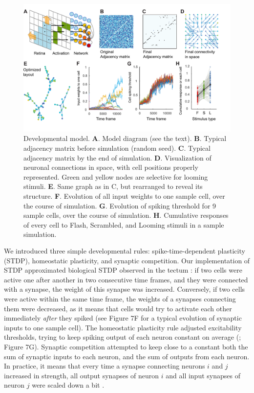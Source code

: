 \documentclass{article}
\begin{document}
\begin{figure}[!t]
\includegraphics[width=\linewidth]{fig7.pdf}
\caption{
Developmental model. \textbf{A}. Model diagram (see the text). \textbf{B}. Typical adjacency matrix before simulation (random seed). \textbf{C}. Typical adjacency matrix by the end of simulation. \textbf{D}. Visualization of neuronal connections in space, with cell positions properly represented. Green and yellow nodes are selective for looming stimuli. \textbf{E}. Same graph as in C, but rearranged to reveal its structure. \textbf{F}. Evolution of all input weights to one sample cell, over the course of simulation. \textbf{G}. Evolution of spiking threshold for 9 sample cells, over the course of simulation. \textbf{H}. Cumulative responses of every cell to Flash, Scrambled, and Looming stimuli in a sample simulation. }
\end{figure}

We introduced three simple developmental rules: spike-time-dependent plasticity (STDP), homeostatic plasticity, and synaptic competition. Our implementation of STDP approximated biological STDP observed in the tectum \citep{zhang1998stdp, mu2006stdp}: if two cells were active one after another in two consecutive time frames, and they were connected with a synapse, the weight of this synapse was increased. Conversely, if two cells were active within the same time frame, the weights of a synapses connecting them were decreased, as it means that cells would try to activate each other immediately \textit{after} they spiked (see Figure 7F for a typical evolution of synaptic inputs to one sample cell). The homeostatic plasticity rule adjusted excitability thresholds, trying to keep spiking output of each neuron constant on average (\citealt{pratt2007intrinsic, turrigiano2011}; Figure 7G). Synaptic competition attempted to keep close to a constant both the sum of synaptic inputs to each neuron, and the sum of outputs from each neuron. In practice, it means that every time a synapse connecting neurons $i$ and $j$ increased in strength, all output synapses of neuron $i$ and all input synapses of neuron $j$ were scaled down a bit \citep{cohen2002synreview, munz2014hebbian, hamodi2016nmda}.
\end{document}
